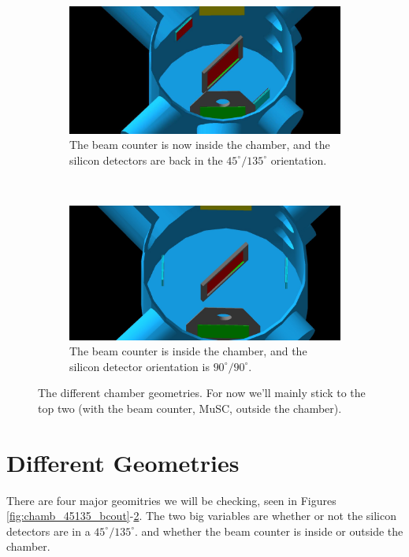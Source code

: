 \documentclass[a4paper]{article}
\begin{document}
\begin{figure}
  \begin{subfigure}[t]{0.45\textwidth}
    \includegraphics[scale=0.15]{chamber_orientations_pics/chamber_45135_BCin}
    \caption{The beam counter is now inside the chamber, and the silicon detectors
    are back in the $45^{\circ}/135^{\circ}$ orientation.}
    \label{fig:chamb_45135_bcin}
  \end{subfigure}
  ~
  \begin{subfigure}[t]{0.45\textwidth}
    \includegraphics[scale=0.135]{chamber_orientations_pics/chamber_9090_BCin}
    \caption{The beam counter is inside the chamber, and the silicon detector orientation
    is $90^{\circ}/90^{\circ}$.}
    \label{fig:chamb_9090_bcin}
  \end{subfigure}
  \caption{The different chamber geometries. For now we'll mainly stick
  to the top two (with the beam counter, MuSC, outside the chamber).}
  \label{fig:chamb_geos}
\end{figure}

\section{Different Geometries}
There are four major geomitries we will be checking,
seen in Figures \ref{fig:chamb_45135_bcout}-\ref{fig:chamb_9090_bcin}.
The two big variables are whether or not the silicon detectors are
in a $45^{\circ}/135^{\circ}$. and whether the beam counter is inside or
outside the chamber.
\end{document}
